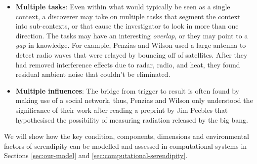 \begin{itemize}
\item \textbf{Multiple tasks}: Even within what would typically be
  seen as a single context, a discoverer may take on multiple tasks
  that segment the context into sub-contexts, or that cause the
  investigator to look in more than one direction.  The tasks may have
  an interesting \emph{overlap}, or they may point to a \emph{gap} in
  knowledge.  For example, Penzias and Wilson used a
  large antenna to detect radio waves that were relayed by bouncing
  off of satellites.  After they had removed interference effects due
  to radar, radio, and heat, they found residual ambient noise that
  couldn't be eliminated.
\end{itemize}

\begin{itemize}
\item \textbf{Multiple influences}: The bridge from trigger to
  result is often found by making use of a social network, thus, 
  Penzias and Wilson only understood the significance of their work
  after reading a preprint by Jim Peebles that hypothesised the
  possibility of measuring radiation released by the big bang.
\end{itemize}

\noindent We will show how the key condition, components,
dimensions and environmental factors of serendipity can be modelled
and assessed in computational systems in Sections \ref{sec:our-model}
and \ref{sec:computational-serendipity}.
